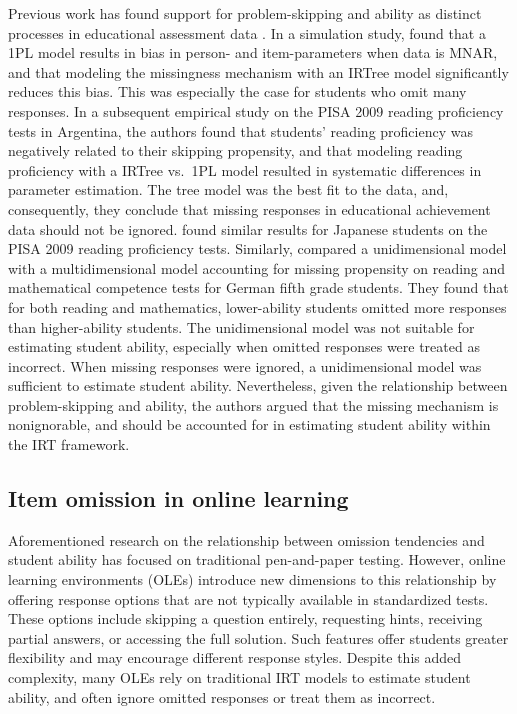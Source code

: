\documentclass[anonymous,manuscript,review]{acmart}
\begin{document}
Previous work has found support for problem-skipping and ability as distinct processes in educational assessment data \cite{okumura2014empirical, pohl2014dealing, debeer2017modeling, huang2020mixture, holman2005modelling}. In a simulation study, \citet{debeer2017modeling} found that a 1PL model results in bias in person- and item-parameters when data is MNAR, and that modeling the missingness mechanism with an IRTree model significantly reduces this bias. This was especially the case for students who omit many responses. In a subsequent empirical study on the PISA 2009 reading proficiency tests in Argentina, the authors found that students' reading proficiency was negatively related to their skipping propensity, and that modeling reading proficiency with a IRTree vs.\ 1PL model resulted in systematic differences in parameter estimation. The tree model was the best fit to the data, and, consequently, they conclude that missing responses in educational achievement data should not be ignored. \citet{okumura2014empirical} found similar results for Japanese students on the PISA 2009 reading proficiency tests. Similarly, \citet{pohl2014dealing} compared a unidimensional model with a multidimensional model accounting for missing propensity on reading and mathematical competence tests for German fifth grade students. They found that for both reading and mathematics, lower-ability students omitted more responses than higher-ability students. The unidimensional model was not suitable for estimating student ability, especially when omitted responses were treated as incorrect. When missing responses were ignored, a unidimensional model was sufficient to estimate student ability. Nevertheless, given the relationship between problem-skipping and ability, the authors argued that the missing mechanism is nonignorable, and should be accounted for in estimating student ability within the IRT framework. 

\subsection{Item omission in online learning}
Aforementioned research on the relationship between omission tendencies and student ability has focused on traditional pen-and-paper testing. However, online learning environments (OLEs) introduce new dimensions to this relationship by offering response options that are not typically available in standardized tests. These options include skipping a question entirely, requesting hints, receiving partial answers, or accessing the full solution. Such features offer students greater flexibility and may encourage different response styles. Despite this added complexity, many OLEs rely on traditional IRT models to estimate student ability, and often ignore omitted responses or treat them as incorrect.
\end{document}
